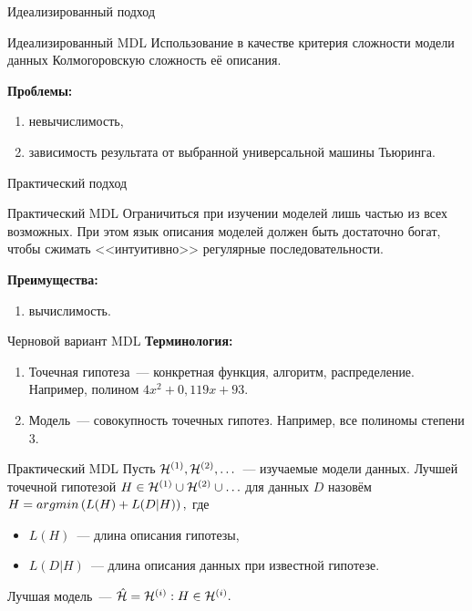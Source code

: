 \documentclass[unicode,lefteqn,c,hyperref={pdfpagelabels=true}]{beamer}
\begin{document}
\begin{frame}{Идеализированный подход}
	\begin{block}{Идеализированный MDL}
	Использование в качестве критерия сложности модели данных Колмогоровскую сложность её описания.
	\end{block}

	\textbf{Проблемы:}
	\begin{enumerate}
		\item невычислимость,
		\item зависимость результата от выбранной универсальной машины Тьюринга.
	\end{enumerate}
\end{frame}

\begin{frame}{Практический подход}
	\begin{block}{Практический MDL}
	Ограничиться при изучении моделей лишь частью из всех возможных. 
	При этом язык описания моделей должен быть достаточно богат, чтобы сжимать <<интуитивно>> регулярные последовательности.
	\end{block}

	\textbf{Преимущества:}
	\begin{enumerate}
		\item вычислимость.
	\end{enumerate}
\end{frame}

\newcommand\mch[1]{\mathcal H^{\cbr{#1}}}
\begin{frame}{Черновой вариант MDL}
	\textbf{Терминология:}
	\begin{enumerate}
		\item Точечная гипотеза~--- конкретная функция, алгоритм, распределение. 
		Например, полином $4x^2+0{,}119x+93.$
		\item Модель~--- совокупность точечных гипотез. Например, все полиномы степени 3.
	\end{enumerate}
	\begin{block}{Практический MDL}
	Пусть $\mch 1, \mch 2, \ldots$~--- изучаемые модели данных. Лучшей точечной гипотезой $H \in \mch 1 \cup \mch 2 \cup \ldots$ для данных $D$ назовём 
	$H = \mathop{arg\,\!min}\limits \left(L(H) + L(D|H)\right),$
	где 
	\begin{itemize}
		\item $L(H)$~--- длина описания гипотезы,
		\item $L(D|H)$~--- длина описания данных при известной гипотезе.
	\end{itemize}
	Лучшая модель~--- $\hat {\mathcal H} = \mch i: H \in \mch i.$
	\end{block}
\end{frame}
\end{document}
